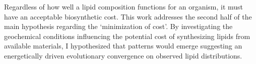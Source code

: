 Regardless of how well a lipid composition functions for an organism, it must have an acceptable biosynthetic cost. This work addresses the second half of the main hypothesis regarding the `minimization of cost'. By investigating the geochemical conditions influencing the potential cost of synthesizing lipids from available materials, I hypothesized that patterns would emerge suggesting an energetically driven evolutionary convergence on observed lipid distributions. %


% 





